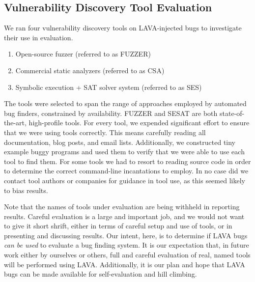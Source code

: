 \subsection{Vulnerability Discovery Tool Evaluation}
We ran four vulnerability discovery tools on LAVA-injected bugs to investigate their use in evaluation.
\begin{enumerate}
\item Open-source fuzzer (referred to as FUZZER)
\item Commercial static analyzers (referred to as CSA) %
\item Symbolic execution + SAT solver system (referred to as SES)
\end{enumerate}
The tools were selected to span the range of approaches employed by automated bug finders, constrained by availability.
FUZZER and SESAT are both state-of-the-art, high-profile tools. 
For every tool, we expended significant effort to ensure that we were using tools correctly.
This means carefully reading all documentation, blog posts, and email lists.
Additionally, we constructed tiny example buggy programs and used them to verify that we were able to use each tool to find them.  
For some tools we had to resort to reading source code in order to determine the correct command-line incantations to employ. 
In no case did we contact tool authors or companies for guidance in tool use, as this seemed likely to bias results.

Note that the names of tools under evaluation are being withheld in reporting results.
Careful evaluation is a large and important job, and we would not want to give it short shrift, either in terms of careful setup and use of tools, or in presenting and discussing results.
Our intent, here, is to determine if LAVA bugs \emph{can be used} to evaluate a bug finding system. 
It is our expectation that, in future work either by ourselves or others, full and careful evaluation of real, named tools will be performed using LAVA.
Additionally, it is our plan and hope that LAVA bugs can be made available for self-evaluation and hill climbing.


